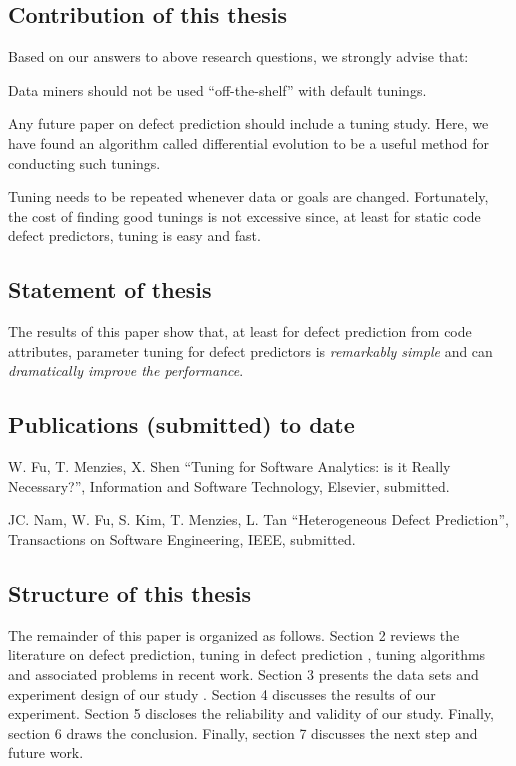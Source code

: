 \subsection{Contribution of this thesis}

Based on our answers to above research questions,  we strongly advise that:
\bi
\item
Data miners should not be used ``off-the-shelf'' with default tunings.
\item
Any future paper on defect prediction should include a 
tuning study. Here, we have found  an algorithm called differential
evolution to be a useful method for conducting such
tunings.
\item
Tuning needs to be repeated
whenever data or goals are changed.
Fortunately, the cost of finding good tunings is not excessive since, at least for
static code defect predictors, tuning is easy and fast.
\ei

\subsection{Statement of thesis}

The results of this paper show that, at least for
defect prediction from  code attributes, parameter tuning for defect predictors is {\em remarkably simple} and can {\em dramatically improve the performance}. 

\subsection{Publications (submitted) to date}

\bi
\item W. Fu, T. Menzies, X. Shen ``Tuning for Software Analytics: is it Really Necessary?'', Information and Software Technology, Elsevier, submitted.

\item JC. Nam, W. Fu, S. Kim, T. Menzies, L. Tan ``Heterogeneous Defect Prediction'', Transactions on Software Engineering, IEEE, submitted.
\ei

\subsection{Structure of this thesis}

The remainder of this paper is organized as follows. Section 2 reviews the literature on defect prediction, tuning in defect prediction , tuning algorithms and associated problems in recent work. Section 3 presents the data sets and  experiment design of our study . Section 4 discusses the results of our experiment. Section 5 discloses the reliability and validity of our study. Finally, section 6 draws the conclusion. Finally, section 7 discusses the next step and future work.



